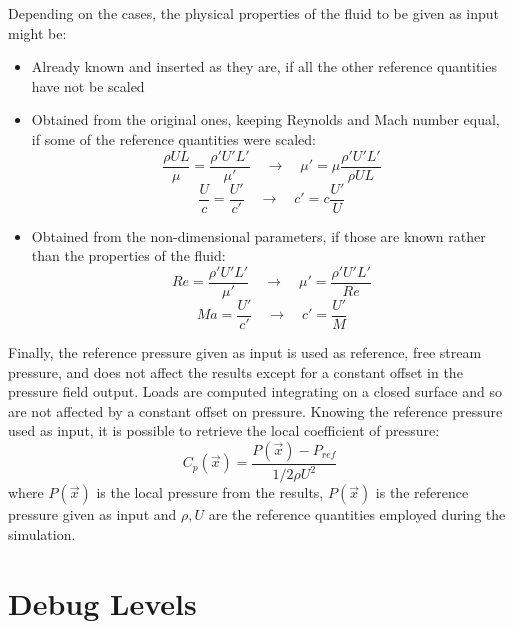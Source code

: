 \begin{example}
\label{ex:rema-scaling}
Depending on the cases, the physical properties of the fluid to be given as input might be:
\begin{itemize}
    \item Already known and inserted as they are, if all the other reference 
    quantities have not be scaled
    \item Obtained from the original ones, keeping Reynolds and Mach number 
    equal, if some of the reference quantities were scaled:
    \begin{equation*}
        \frac{\rho U L}{\mu} = \frac{\rho' U' L'}{\mu'} \quad \rightarrow \quad \mu' = \mu \frac{\rho' U' L'}{\rho U L}
    \end{equation*}
    \begin{equation*}
        \frac{U}{c} = \frac{U'}{c'} \quad \rightarrow \quad c' = c \frac{U'}{U}
    \end{equation*}
    \item Obtained from the non-dimensional parameters, if those are known rather 
    than the properties of the fluid:
    \begin{equation*}
        Re = \frac{\rho' U' L'}{\mu'} \quad \rightarrow \quad \mu' = \frac{\rho' U' L'}{Re}
    \end{equation*}
    \begin{equation*}
        Ma = \frac{U'}{c'} \quad \rightarrow \quad c' = \frac{U'}{M}
    \end{equation*}
\end{itemize}
\end{example}

Finally, the reference pressure given as input is used as reference, 
free stream pressure, and does not affect the results except for a 
constant offset in the pressure field output. Loads are computed 
integrating on a closed surface and so are not affected by a constant 
offset on pressure. Knowing the reference pressure used as input, 
it is possible to retrieve the local coefficient of pressure:
\begin{equation*}
    C_p(\vec{x}) = \frac{P(\vec{x})-P_{ref}}{1/2 \rho U^2}
\end{equation*}
where $P(\vec{x})$ is the local pressure from the results, $P(\vec{x})$ 
is the reference pressure given as input and $\rho, U$ are the reference 
quantities employed during the simulation. 


\section{Debug Levels}
\label{sec:Solver_DebugLevels}

